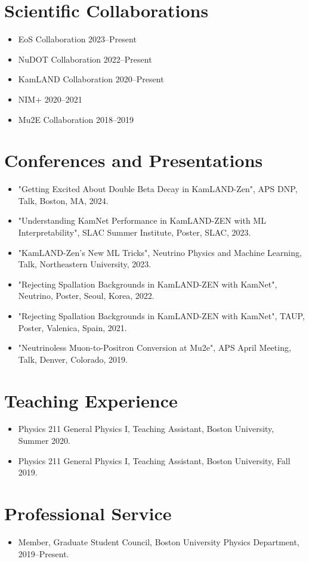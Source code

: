 \section*{Scientific Collaborations}
\begin{itemize}[leftmargin=*]
	\item EoS Collaboration 2023--Present
	\item NuDOT Collaboration 2022--Present
    \item KamLAND Collaboration 2020--Present
    \item NIM+ 2020--2021
	\item Mu2E Collaboration 2018--2019
\end{itemize}

\section*{Conferences and Presentations}
\begin{itemize}[leftmargin=*]
    \item "Getting Excited About Double Beta Decay in KamLAND-Zen", APS DNP, Talk, Boston, MA, 2024.
    \item "Understanding KamNet Performance in KamLAND-ZEN with ML Interpretability", SLAC Summer Institute, Poster, SLAC, 2023.
    \item "KamLAND-Zen's New ML Tricks", Neutrino Physics and Machine Learning, Talk, Northeastern University, 2023.
    \item "Rejecting Spallation Backgrounds in KamLAND-ZEN with KamNet", Neutrino, Poster, Seoul, Korea, 2022.
    \item "Rejecting Spallation Backgrounds in KamLAND-ZEN with KamNet", TAUP, Poster, Valenica, Spain, 2021.
    \item "Neutrinoless Muon-to-Positron Conversion at Mu2e", APS April Meeting, Talk, Denver, Colorado, 2019.
\end{itemize}

\section*{Teaching Experience}
\begin{itemize}[leftmargin=*]
    \item Physics 211 General Physics I, Teaching Assistant, Boston University, Summer 2020.
    \item Physics 211 General Physics I, Teaching Assistant, Boston University, Fall 2019.
\end{itemize}

\section*{Professional Service}
\begin{itemize}[leftmargin=*]
    \item Member, Graduate Student Council, Boston University Physics Department, 2019--Present.
\end{itemize}


